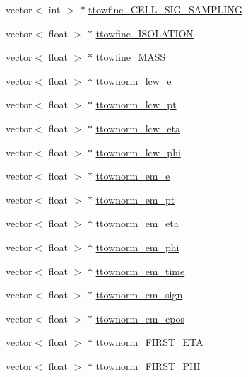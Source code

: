 \begin{DoxyCompactItemize}
vector$<$ int $>$ $\ast$ \hyperlink{classXMLWriter_a0fe67d11f7f63a29e16d7e4e70e42e6b}{ttowfine\+\_\+\+C\+E\+L\+L\+\_\+\+S\+I\+G\+\_\+\+S\+A\+M\+P\+L\+I\+NG}
\item 
vector$<$ float $>$ $\ast$ \hyperlink{classXMLWriter_a81b14a87031943842a87eb34bd35e661}{ttowfine\+\_\+\+I\+S\+O\+L\+A\+T\+I\+ON}
\item 
vector$<$ float $>$ $\ast$ \hyperlink{classXMLWriter_a0bcb0c93fc778595b09c2735c619ca2f}{ttowfine\+\_\+\+M\+A\+SS}
\item 
vector$<$ float $>$ $\ast$ \hyperlink{classXMLWriter_a7c56db48984eae81648b186945ba0ebe}{ttownorm\+\_\+lcw\+\_\+e}
\item 
vector$<$ float $>$ $\ast$ \hyperlink{classXMLWriter_a9ad5412d1c6e40c9df6947dd949c1023}{ttownorm\+\_\+lcw\+\_\+pt}
\item 
vector$<$ float $>$ $\ast$ \hyperlink{classXMLWriter_aa97c40b6600897dd279904852b5e8c79}{ttownorm\+\_\+lcw\+\_\+eta}
\item 
vector$<$ float $>$ $\ast$ \hyperlink{classXMLWriter_ac34a3d5c0aac2d3d2ad8ae2f820f3d54}{ttownorm\+\_\+lcw\+\_\+phi}
\item 
vector$<$ float $>$ $\ast$ \hyperlink{classXMLWriter_a6ef722399fb7bae5e7217c862328a964}{ttownorm\+\_\+em\+\_\+e}
\item 
vector$<$ float $>$ $\ast$ \hyperlink{classXMLWriter_a38e456b4c38bc1ebd5a6055b4b65b95b}{ttownorm\+\_\+em\+\_\+pt}
\item 
vector$<$ float $>$ $\ast$ \hyperlink{classXMLWriter_a4413db6102c9eb6c32fbb7d33d089994}{ttownorm\+\_\+em\+\_\+eta}
\item 
vector$<$ float $>$ $\ast$ \hyperlink{classXMLWriter_aac3fa89856747d596c315634812c73bf}{ttownorm\+\_\+em\+\_\+phi}
\item 
vector$<$ float $>$ $\ast$ \hyperlink{classXMLWriter_a242a7d33d6ac083c20e8a77614008a26}{ttownorm\+\_\+em\+\_\+time}
\item 
vector$<$ float $>$ $\ast$ \hyperlink{classXMLWriter_a836b966bfc93f49946810bab74574d80}{ttownorm\+\_\+em\+\_\+sign}
\item 
vector$<$ float $>$ $\ast$ \hyperlink{classXMLWriter_a0c5e36a0e3d507118ddc81df666f5988}{ttownorm\+\_\+em\+\_\+epos}
\item 
vector$<$ float $>$ $\ast$ \hyperlink{classXMLWriter_a06b7f46b2dd83aaafb2634273ee4fe8e}{ttownorm\+\_\+\+F\+I\+R\+S\+T\+\_\+\+E\+TA}
\item 
vector$<$ float $>$ $\ast$ \hyperlink{classXMLWriter_a5a70c546d8c9760e1da6f218e0246150}{ttownorm\+\_\+\+F\+I\+R\+S\+T\+\_\+\+P\+HI}

\end{DoxyCompactItemize}
